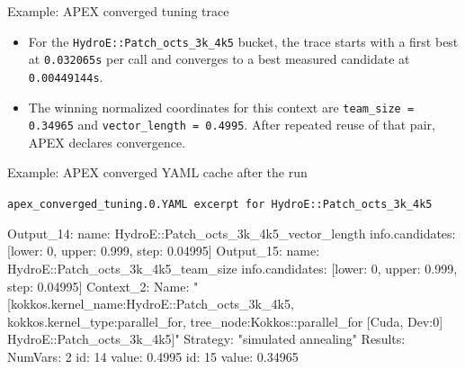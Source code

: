\documentclass[11pt]{beamer}
\begin{document}
\begin{frame}[fragile,t]{Example: APEX converged tuning trace}
\begin{beamerboxesrounded}[upper=terminal title,lower=terminal body,width=\linewidth,shadow=false]
\end{beamerboxesrounded}
\vspace{0.08em}
\scriptsize
\begin{itemize}\itemsep0.06em
    \item For the \texttt{HydroE::Patch\_octs\_3k\_4k5} bucket, the trace starts with a first best at \texttt{\textcolor{red!80!black}{0.032065s}} per call and converges to a best measured candidate at \texttt{\textcolor{red!80!black}{0.00449144s}}.
    \item The winning normalized coordinates for this context are \texttt{team\_size = 0.34965} and \texttt{vector\_length = 0.4995}. After repeated reuse of that pair, APEX declares convergence.
\end{itemize}
\end{frame}

\begin{frame}[fragile,t]{Example: APEX converged YAML cache after the run}
\begin{beamerboxesrounded}[upper=terminal title,lower=terminal body,width=\linewidth,shadow=false]{%
\textcolor{red!70}{\footnotesize\textbullet}\hspace{0.15em}%
\textcolor{yellow!80}{\footnotesize\textbullet}\hspace{0.15em}%
\textcolor{green!70!black}{\footnotesize\textbullet}\hspace{0.55em}%
\texttt{\scriptsize apex\_converged\_tuning.0.YAML excerpt for HydroE::Patch\_octs\_3k\_4k5}}
{\ttfamily\tiny\color{termText}
\begin{semiverbatim}
Output_14:
  name: \textcolor{green!70!black}{HydroE::Patch_octs_3k_4k5_vector_length}
  info.candidates: \textcolor{hotspotBlue}{[lower: 0, upper: 0.999, step: 0.04995]}
Output_15:
  name: \textcolor{green!70!black}{HydroE::Patch_octs_3k_4k5_team_size}
  info.candidates: \textcolor{hotspotBlue}{[lower: 0, upper: 0.999, step: 0.04995]}
Context_2:
  Name: "[kokkos.kernel_name:\textcolor{patchBlue}{HydroE::Patch_octs_3k_4k5},
         kokkos.kernel_type:parallel_for,
         tree_node:Kokkos::parallel_for [Cuda, Dev:0] \textcolor{patchBlue}{HydroE::Patch_octs_3k_4k5}]"
  Strategy: "simulated annealing"
  Results:
    NumVars: 2
    id: 14
    value: \textcolor{hlOrange}{0.4995}
    id: 15
    value: \textcolor{hlOrange}{0.34965}
\end{semiverbatim}}
\end{beamerboxesrounded}
\end{frame}
\end{document}
